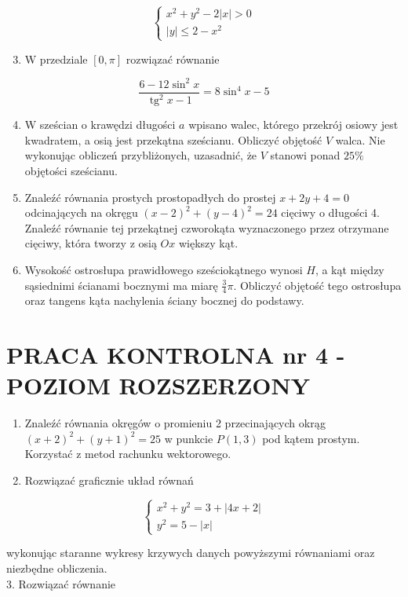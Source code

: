 \documentclass[10pt]{article}
\begin{document}
$$
\left\{\begin{array}{l}
x^{2}+y^{2}-2|x|>0 \\
|y| \leqslant 2-x^{2}
\end{array}\right.
$$

\begin{enumerate}
  \setcounter{enumi}{2}
  \item W przedziale $[0, \pi]$ rozwiązać równanie
\end{enumerate}

$$
\frac{6-12 \sin ^{2} x}{\operatorname{tg}^{2} x-1}=8 \sin ^{4} x-5
$$

\begin{enumerate}
  \setcounter{enumi}{3}
  \item W sześcian o krawędzi długości $a$ wpisano walec, którego przekrój osiowy jest kwadratem, a osią jest przekątna sześcianu. Obliczyć objętość $V$ walca. Nie wykonując obliczeń przybliżonych, uzasadnić, że $V$ stanowi ponad $25 \%$ objętości sześcianu.
  \item Znaleźć równania prostych prostopadłych do prostej $x+2 y+4=0$ odcinających na okręgu $(x-2)^{2}+(y-4)^{2}=24$ cięciwy o długości 4. Znaleźć równanie tej przekątnej czworokąta wyznaczonego przez otrzymane cięciwy, która tworzy z osią $O x$ większy kąt.
  \item Wysokość ostrosłupa prawidłowego sześciokątnego wynosi $H$, a kąt między sąsiednimi ścianami bocznymi ma miarę $\frac{3}{4} \pi$. Obliczyć objętość tego ostrosłupa oraz tangens kąta nachylenia ściany bocznej do podstawy.
\end{enumerate}

\section*{PRACA KONTROLNA nr 4 - POZIOM ROZSZERZONY}
\begin{enumerate}
  \item Znaleźć równania okręgów o promieniu 2 przecinających okrąg $(x+2)^{2}+(y+1)^{2}=25$ w punkcie $P(1,3)$ pod kątem prostym. Korzystać z metod rachunku wektorowego.
  \item Rozwiązać graficznie układ równań
\end{enumerate}

$$
\left\{\begin{array}{l}
x^{2}+y^{2}=3+|4 x+2| \\
y^{2}=5-|x|
\end{array}\right.
$$

wykonując staranne wykresy krzywych danych powyższymi równaniami oraz niezbędne obliczenia.\\
3. Rozwiązać równanie
\end{document}
